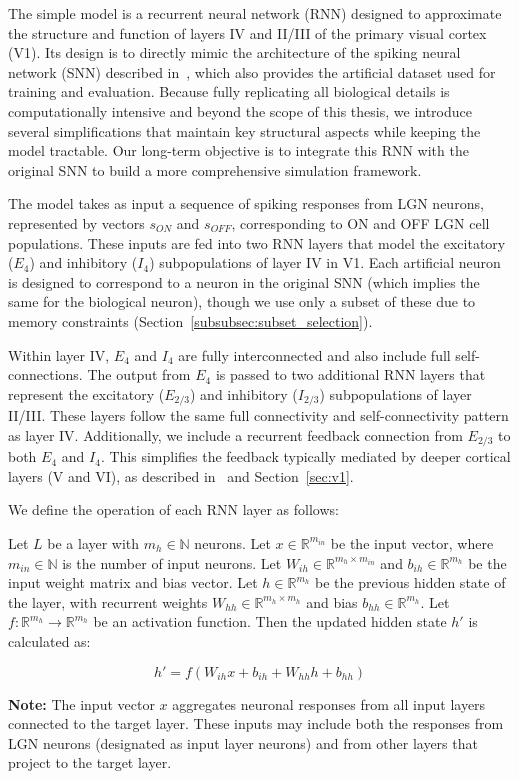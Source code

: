 The simple model is a recurrent neural network (RNN) designed to approximate the structure and function of layers IV and II/III of the primary visual cortex (V1). Its design is to directly mimic the architecture of the spiking neural network (SNN) described in~\citet{antolik2024comprehensive}, which also provides the artificial dataset used for training and evaluation. Because fully replicating all biological details is computationally intensive and beyond the scope of this thesis, we introduce several simplifications that maintain key structural aspects while keeping the model tractable. Our long-term objective is to integrate this RNN with the original SNN to build a more comprehensive simulation framework.

The model takes as input a sequence of spiking responses from LGN neurons, represented by vectors $s_{ON}$ and $s_{OFF}$, corresponding to ON and OFF LGN cell populations. These inputs are fed into two RNN layers that model the excitatory ($E_4$) and inhibitory ($I_4$) subpopulations of layer IV in V1. Each artificial neuron is designed to correspond to a neuron in the original SNN (which implies the same for the biological neuron), though we use only a subset of these due to memory constraints (Section~\ref{subsubsec:subset_selection}).

Within layer IV, $E_4$ and $I_4$ are fully interconnected and also include full self-connections. The output from $E_4$ is passed to two additional RNN layers that represent the excitatory ($E_{2/3}$) and inhibitory ($I_{2/3}$) subpopulations of layer II/III. These layers follow the same full connectivity and self-connectivity pattern as layer IV. Additionally, we include a recurrent feedback connection from $E_{2/3}$ to both $E_4$ and $I_4$. This simplifies the feedback typically mediated by deeper cortical layers (V and VI), as described in~\citet{antolik2024comprehensive} and Section~\ref{sec:v1}.

We define the operation of each RNN layer as follows:

\begin{defn}
    Let $L$ be a layer with $m_h \in \mathbb{N}$ neurons. Let $x \in \mathbb{R}^{m_{in}}$ be the input vector, where $m_{in} \in \mathbb{N}$ is the number of input neurons. Let $W_{ih} \in \mathbb{R}^{m_h \times m_{in}}$ and $b_{ih} \in \mathbb{R}^{m_h}$ be the input weight matrix and bias vector. Let $h \in \mathbb{R}^{m_h}$ be the previous hidden state of the layer, with recurrent weights $W_{hh} \in \mathbb{R}^{m_h \times m_h}$ and bias $b_{hh} \in \mathbb{R}^{m_h}$. Let $f: \mathbb{R}^{m_h} \to \mathbb{R}^{m_h}$ be an activation function. Then the updated hidden state $h'$ is calculated as:
    
    $$h' = f\left(W_{ih}x + b_{ih} + W_{hh}h + b_{hh}\right)$$

    \textbf{Note:} The input vector $x$ aggregates neuronal responses from all input layers connected to the target layer. These inputs may include both the responses from LGN neurons (designated as input layer neurons) and from other layers that project to the target layer. 
\end{defn}
\label{def:base_neuron}

